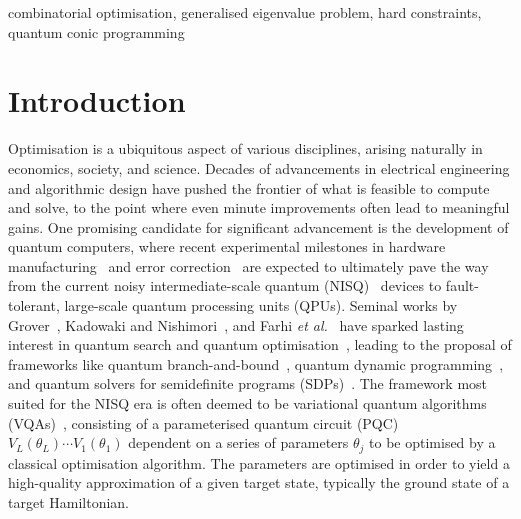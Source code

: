 \documentclass[10pt,conference]{IEEEtran}
\begin{document}
\begin{IEEEkeywords}
    combinatorial optimisation,
    generalised eigenvalue problem,
    hard constraints,
    quantum conic programming
\end{IEEEkeywords}


\section{\label{section:Introduction}Introduction}

Optimisation is a ubiquitous aspect of various disciplines, arising naturally in economics, society, and science.
Decades of advancements in electrical engineering and algorithmic design have pushed the frontier of what is feasible to compute and solve, to the point where even minute improvements often lead to meaningful gains.
One promising candidate for significant advancement is the development of quantum computers, where recent experimental milestones in hardware manufacturing~\cite{PsiquantumTeam2025AManufacturablePlatformForPhotonicQuantumComputing} and error correction~\cite{GoogleQuantumAi2023SuppressingQuantumErrorsByScalingASurfaceCodeLogicalQubit} are expected to ultimately pave the way from the current noisy intermediate-scale quantum (NISQ)~\cite{Preskill2018QuantumComputingInTheNisqEraAndBeyond} devices to fault-tolerant, large-scale quantum processing units (QPUs).
Seminal works by Grover~\cite{Grover1997QuantumMechanicsHelpsInSearchingForANeedleInAHaystack}, Kadowaki and Nishimori~\cite{Kadowaki1998QuantumAnnealingInTheTransverseIsingModel}, and Farhi \textit{et al.}~\cite{Farhi2000QuantumComputationByAdiabaticEvolution} have sparked lasting interest in quantum search and quantum optimisation~\cite{Abbas2024ChallengesAndOpportunitiesInQuantumOptimization}, leading to the proposal of frameworks like quantum branch-and-bound~\cite{Montanaro2020QuantumSpeedupOfBranchAndBoundAlgorithms}, quantum dynamic programming~\cite{Ambainis2019QuantumSpeedupsForExponentialTimeDynamicProgrammingAlgorithms}, and quantum solvers for semidefinite programs (SDPs)~\cite{VanApeldoorn2020QuantumSdpSolversBetterUpperAndLowerBounds}.
The framework most suited for the NISQ era is often deemed to be variational quantum algorithms (VQAs)~\cite{Cerezo2021VariationalQuantumAlgorithms}, consisting of a parameterised quantum circuit (PQC) $V_{L}(\theta_{L}) \cdots V_{1}(\theta_{1})$ dependent on a series of parameters $\theta_{j}$ to be optimised by a classical optimisation algorithm.
The parameters are optimised in order to yield a high-quality approximation of a given target state, typically the ground state of a target Hamiltonian.
\end{document}
